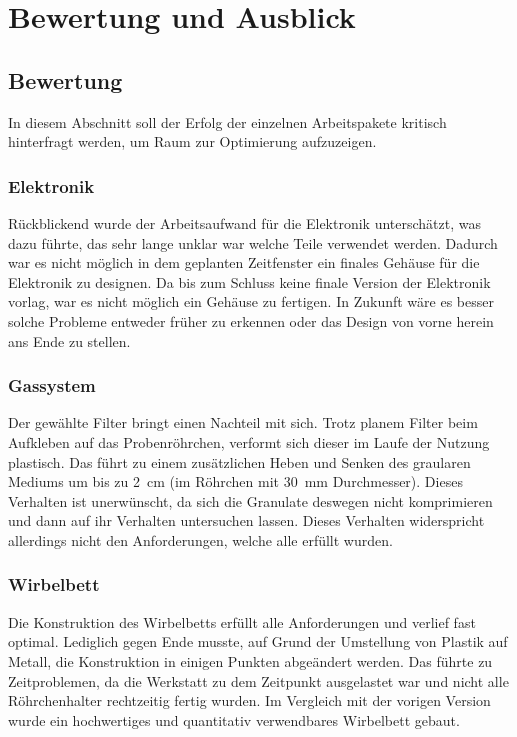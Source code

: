 \chapter{Bewertung und Ausblick}


\section{Bewertung}

In diesem Abschnitt soll der Erfolg der einzelnen Arbeitspakete kritisch hinterfragt werden, um Raum zur Optimierung aufzuzeigen. 

\subsection{Elektronik}

Rückblickend wurde der Arbeitsaufwand für die Elektronik unterschätzt, was dazu führte, das sehr lange unklar war welche Teile verwendet werden. Dadurch war es nicht möglich in dem geplanten Zeitfenster ein finales Gehäuse für die Elektronik zu designen. Da bis zum Schluss keine finale Version der Elektronik vorlag, war es nicht möglich ein Gehäuse zu fertigen. In Zukunft wäre es besser solche Probleme entweder früher zu erkennen oder das Design von vorne herein ans Ende zu stellen. 

\subsection{Gassystem}

Der gewählte Filter bringt einen Nachteil mit sich. Trotz planem Filter beim Aufkleben auf das Probenröhrchen, verformt sich dieser im Laufe der Nutzung plastisch. Das führt zu einem zusätzlichen Heben und Senken des graularen Mediums um bis zu \SI{2}{cm} (im Röhrchen mit \SI{30}{mm}  Durchmesser). Dieses Verhalten ist unerwünscht, da sich die Granulate deswegen nicht komprimieren und dann auf ihr Verhalten untersuchen lassen. Dieses Verhalten widerspricht allerdings nicht den Anforderungen, welche alle erfüllt wurden.

\subsection{Wirbelbett}

Die Konstruktion des Wirbelbetts erfüllt alle Anforderungen und verlief fast optimal. Lediglich gegen Ende musste, auf Grund der Umstellung von Plastik auf Metall, die Konstruktion in einigen Punkten abgeändert werden. Das führte zu Zeitproblemen, da die Werkstatt zu dem Zeitpunkt ausgelastet war und nicht alle Röhrchenhalter rechtzeitig fertig wurden.
Im Vergleich mit der vorigen Version wurde ein hochwertiges und quantitativ verwendbares Wirbelbett gebaut.

